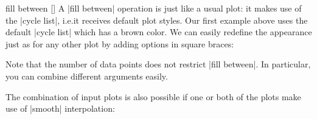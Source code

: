 \begin{addplotoperation}[]{fill between}{%
    []
}
    A |fill between| operation is just like a usual plot: it makes use of the
    |cycle list|, i.e.\@ it receives default plot styles. Our first example
    above uses the default |cycle list| which has a brown color. We can easily
    redefine the appearance just as for any other plot by adding options in
    square braces:
\begin{codeexample}[]
\end{codeexample}

    Note that the number of data points does not restrict |fill between|. In
    particular, you can combine different arguments easily.
\begin{codeexample}[]
\end{codeexample}

    The combination of input plots is also possible if one or both of the plots
    make use of |smooth| interpolation:
\begin{codeexample}[]
\end{codeexample}


\end{addplotoperation}
